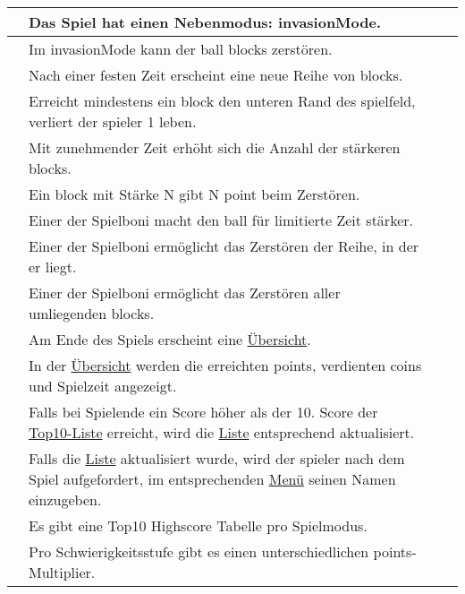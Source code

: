 \begin{xltabular}{\textwidth}{|l|X|r|r|}
    \setSystem{\ref*{sys:inv}}   %

      & \OPT{*} Das Spiel hat einen Nebenmodus: \gls{invasionMode}.    &      &      \\ \hline
      & \OPT{*} Im \gls{invasionMode} kann der \gls{ball} \glspl{block} zerstören.    &      &      \\ \hline
      & \OPT{*} Nach einer festen Zeit erscheint eine neue Reihe von \glspl{block}.     &      &      \\ \hline
      & \OPT{*} Erreicht mindestens ein \gls{block} den unteren Rand des \gls{spielfeld}, verliert der \gls{spieler} 1 \gls{leben}.    &      &      \\ \hline
      & \OPT{*} Mit zunehmender Zeit erhöht sich die Anzahl der stärkeren \glspl{block}.    &      &      \\ \hline
      & \OPT{*} Ein \gls{block} mit Stärke N gibt N \gls{point} beim Zerstören.    &      &      \\ \hline
      & \OPT{*} Einer der Spielboni macht den \gls{ball} für limitierte Zeit stärker.            &      &      \\ \hline
      & \OPT{*} Einer der Spielboni ermöglicht das Zerstören der Reihe, in der er liegt.            &      &      \\ \hline
      & \OPT{*} Einer der Spielboni ermöglicht das Zerstören aller umliegenden \glspl{block}.            &      &      \\ \hline

    \setSystem{\ref*{sys:scs}}   %
    
      & Am Ende des Spiels erscheint eine \hyperref[fig:dia:gameOver]{Übersicht}. &      &      \\ \hline
      & In der \hyperref[fig:dia:gameOver]{Übersicht} werden die erreichten \glspl{point}, verdienten \glspl{coin} und Spielzeit angezeigt. &      &      \\ \hline
      & Falls bei Spielende ein Score höher als der 10. Score der \hyperref[fig:dia:top10]{Top10-Liste} erreicht, wird die \hyperref[fig:dia:top10]{Liste} entsprechend aktualisiert. &      &      \\ \hline
      & Falls die \hyperref[fig:dia:top10]{Liste} aktualisiert wurde, wird der \gls{spieler} nach dem Spiel aufgefordert, im entsprechenden \hyperref[fig:dia:fig:dia:highscore]{Menü} seinen Namen einzugeben.             &      &      \\ \hline
      & \OPT{*}Es gibt eine Top10 Highscore Tabelle pro Spielmodus.            &      &      \\ \hline
      & Pro Schwierigkeitsstufe gibt es einen unterschiedlichen \glspl{point}-Multiplier.             &      &      \\ \hline


\end{xltabular}
